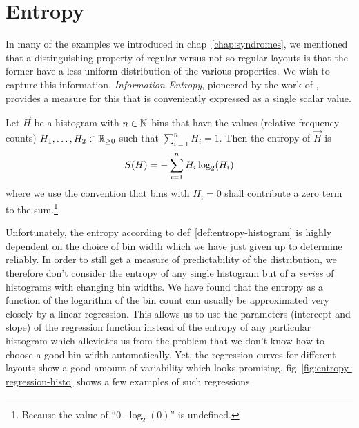 \documentclass{graphstudy}
\begin{document}
\section{Entropy}
\label{sec:entropy}

In many of the examples we introduced in \acl{chap}~\ref{chap:syndromes}, we mentioned that a distinguishing property of
regular versus not-so-regular layouts is that the former have a less uniform distribution of the various properties.  We
wish to capture this information.  \emph{Information Entropy}, pioneered by the work of \textcite{Shannon1948}, provides
a measure for this that is conveniently expressed as a single scalar value.

\begin{definition}
  Let \(\Vec{H}\) be a histogram with \(n\in\mathbb{N}\) bins that have the values (relative frequency counts)
  \(H_1,\ldots,H_2\in\RealsNN\) such that \(\sum_{i=1}^{n}H_i=1\).  Then the entropy of \(\Vec{H}\) is
  \begin{equation}
    \label{eq:discrete-entropy}
    \Entropy(\Vec{H}) = -\sum_{i=1}^{n} H_i \log_2(H_i)
  \end{equation}
  where we use the convention that bins with \(H_i=0\) shall contribute a zero term to the sum.\footnote{%
    Because the value of \enquote{\(0\cdot\log_2(0)\)} is undefined.
  }
  \label{def:entropy-histogram}
\end{definition}

Unfortunately, the entropy according to \acl{def}~\ref{def:entropy-histogram} is highly dependent on the choice of bin
width which we have just given up to determine reliably.  In order to still get a measure of predictability of the
distribution, we therefore don't consider the entropy of any single histogram but of a \emph{series} of histograms with
changing bin widths.  We have found that the entropy as a function of the logarithm of the bin count can usually be
approximated very closely by a linear regression.  This allows us to use the parameters (intercept and slope) of the
regression function instead of the entropy of any particular histogram which alleviates us from the problem that we
don't know how to choose a good bin width automatically.  Yet, the regression curves for different layouts show a good
amount of variability which looks promising.  \Acl{fig}~\ref{fig:entropy-regression-histo} shows a few examples of such
regressions.
\end{document}
